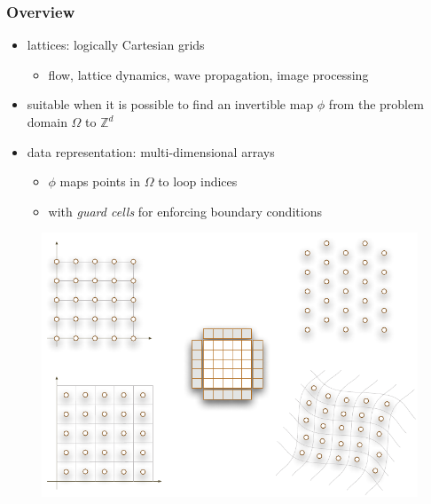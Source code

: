 %
%


\begin{frame}[fragile]
%
  \frametitle{Overview}
%
  \begin{itemize}
%
  \item lattices: logically Cartesian grids
    \begin{itemize}
    \item flow, lattice dynamics, wave propagation, image processing
    \end{itemize}
%
  \item suitable when it is possible to find an invertible map $\phi$ from the problem domain
    $\Omega$ to $\mathbb{Z}^{d}$
%
  \item data representation: multi-dimensional arrays
    \begin{itemize}
    \item $\phi$ maps points in $\Omega$ to loop indices
    \item with {\em guard cells} for enforcing boundary conditions
    \end{itemize}
% 
  \end{itemize}
%
  \begin{figure}
    \includegraphics[scale=0.5]{figures/structured.pdf}
  \end{figure} 
%
\end{frame}

